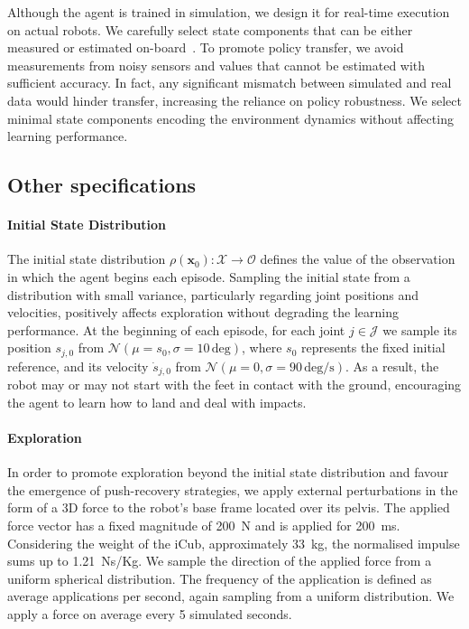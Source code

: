 Although the agent is trained in simulation, we design it for real-time execution on actual robots.
We carefully select state components that can be either measured or estimated on-board~\parencite{nori_icub_2015}.
To promote policy transfer, we avoid measurements from noisy sensors and values that cannot be estimated with sufficient accuracy.
In fact, any significant mismatch between simulated and real data would hinder transfer, increasing the reliance on policy robustness.
We select minimal state components encoding the environment dynamics without affecting learning performance.

\subsection{Other specifications}\label{sec:env-other}

\paragraph{Initial State Distribution}

The initial state distribution $\rho(\mathbf{x}_0): \mathcal{X} \to \mathcal{O}$ defines the value of the observation in which the agent begins each episode.
Sampling the initial state from a distribution with small variance, particularly regarding joint positions and velocities, positively affects exploration without degrading the learning performance.
At the beginning of each episode, for each joint $j \in \mathcal{J}$ we sample its position $s_{j,0}$ from $\mathcal{N}(\mu=s_0, \sigma=10 \, \text{deg})$, where $s_{0}$ represents the fixed initial reference, and its velocity $\dot{s}_{j,0}$ from $\mathcal{N}(\mu=0, \sigma=90 \, \text{deg/s})$.
As a result, the robot may or may not start with the feet in contact with the ground, encouraging the agent to learn how to land and deal with impacts.

\paragraph{Exploration}

In order to promote exploration beyond the initial state distribution and favour the emergence of push-recovery strategies, we apply external perturbations in the form of a 3D force to the robot's base frame located over its pelvis.
The applied force vector has a fixed magnitude of 200~N and is applied for 200~ms.
Considering the weight of the iCub, approximately 33~kg, the normalised impulse sums up to 1.21~Ns/Kg.
We sample the direction of the applied force from a uniform spherical distribution.
The frequency of the application is defined as average applications per second, again sampling from a uniform distribution.
We apply a force on average every 5 simulated seconds.


